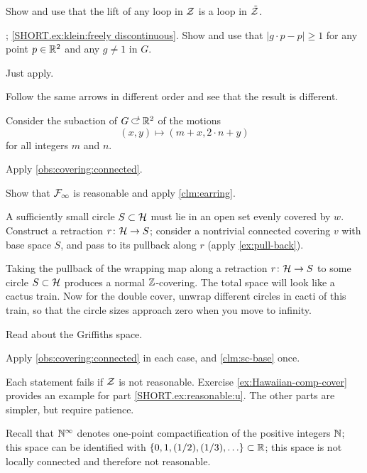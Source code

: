  Show and use that the lift of any loop in $\mathcal{Z}$ is a loop in $\tilde{\mathcal{Z}}$.

\parbf{\ref{ex:klein}}; \ref{SHORT.ex:klein:freely discontinuous}.
Show and use that $|g\cdot p-p|\ge 1$ for any point $p\in\mathbb{R}^2$ and any $g\ne 1$ in $G$.

 Just apply.

 Follow the same arrows in different order and see that the result is different.

Consider the subaction of $G\acts \RR^2$ of the motions
\[(x,y)\mapsto (m+x, 2\cdot n+y)\]
for all integers $m$ and $n$.

Apply \ref{obs:covering:connected}.

Show that $\mathcal{F}_\infty$ is reasonable and apply \ref{clm:earring}.

A sufficiently small circle $S\subset \mathcal{H}$ must lie in an open set evenly covered by $w$.
Construct a retraction $r\colon\mathcal{H}\to S$; consider a nontrivial connected covering $v$ with base space $S$, and pass to its pullback along $r$ (apply \ref{ex:pull-back}).

Taking the pullback of the wrapping map along a retraction $r\colon\mathcal{H}\to S$ to some circle $S\subset \mathcal{H}$ produces a normal $\mathbb{Z}$-covering.
The total space will look like a cactus train.
Now for the double cover, unwrap different circles in cacti of this train, so that the circle sizes approach zero when you move to infinity.

Read about the Griffiths space.

Apply \ref{obs:covering:connected} in each case, and \ref{clm:sc-base} once.

Each statement fails if $\mathcal{Z}$ is not reasonable.
Exercise \ref{ex:Hawaiian-comp-cover} provides an example for part \ref{SHORT.ex:reasonable:u}.
The other parts are simpler, but require patience.

Recall that $\mathbb{N}^\infty$ denotes one-point compactification of the positive integers $\mathbb{N}$;
this space can be identified with $\{0,1,(1/2),(1/3),\ldots\}\subset\mathbb{R}$;
this space is not locally connected and therefore not reasonable.

